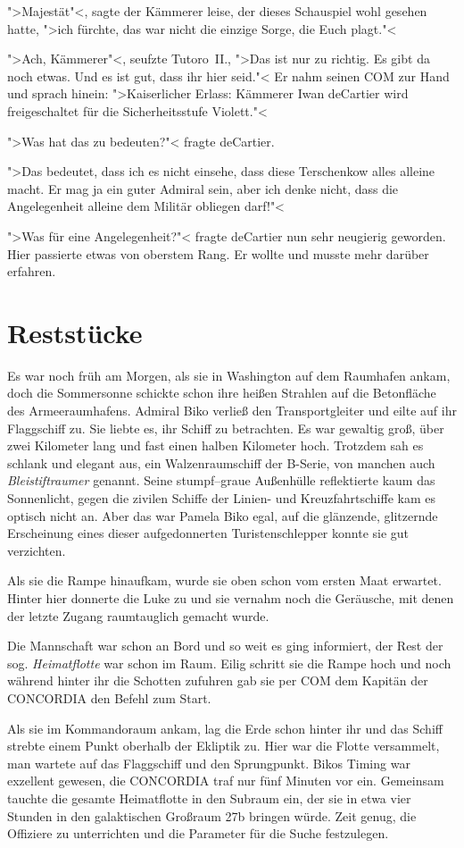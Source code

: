 ">Majestät"<, sagte der Kämmerer leise, der dieses Schauspiel wohl gesehen hatte, ">ich fürchte, das war nicht die einzige Sorge, die Euch plagt."<

">Ach, Kämmerer"<, seufzte Tutoro~II., ">Das ist nur zu richtig. Es gibt da noch etwas. Und es ist gut, dass ihr hier seid."< Er nahm seinen COM zur Hand und sprach hinein: ">Kaiserlicher Erlass: Kämmerer Iwan deCartier wird freigeschaltet für die Sicherheitsstufe Violett."<

">Was hat das zu bedeuten?"< fragte deCartier.

">Das bedeutet, dass ich es nicht einsehe, dass diese Terschenkow alles alleine macht. Er mag ja ein guter Admiral sein, aber ich denke nicht, dass die Angelegenheit alleine dem Militär obliegen darf!"<

">Was für eine Angelegenheit?"< fragte deCartier nun sehr neugierig geworden. Hier passierte etwas von oberstem Rang. Er wollte und musste mehr darüber erfahren.

\chapter*{Reststücke}

Es war noch früh am Morgen, als sie in Washington auf dem Raumhafen ankam, doch die Sommersonne schickte schon ihre heißen Strahlen auf die Betonfläche des Armeeraumhafens. Admiral Biko verließ den Transportgleiter und eilte auf ihr Flaggschiff zu. Sie liebte es, ihr Schiff zu betrachten. Es war gewaltig groß, über zwei Kilometer lang und fast einen halben Kilometer hoch. Trotzdem sah es schlank und elegant aus, ein Walzenraumschiff der \textsf{B-}Serie, von manchen auch \emph{Bleistiftraumer} genannt. Seine stumpf--graue Außenhülle reflektierte kaum das Sonnenlicht, gegen die zivilen Schiffe der Linien- und Kreuzfahrtschiffe kam es optisch nicht an. Aber das war Pamela Biko egal, auf die glänzende, glitzernde Erscheinung eines dieser aufgedonnerten Turistenschlepper konnte sie gut verzichten.

Als sie die Rampe hinaufkam, wurde sie oben schon vom ersten Maat erwartet. Hinter hier donnerte die Luke zu und sie vernahm noch die Geräusche, mit denen der letzte Zugang raumtauglich gemacht wurde. 

Die Mannschaft war schon an Bord und so weit es ging informiert, der Rest der sog. \emph{Heimatflotte} war schon im Raum. Eilig schritt sie die Rampe hoch und noch während hinter ihr die Schotten zufuhren gab sie per COM dem Kapitän der \textsf{CONCORDIA} den Befehl zum Start.

Als sie im Kommandoraum ankam, lag die Erde schon hinter ihr und das Schiff strebte einem Punkt oberhalb der Ekliptik zu. Hier war die Flotte versammelt, man wartete auf das Flaggschiff und den Sprungpunkt. Bikos Timing war exzellent gewesen, die \textsf{CONCORDIA} traf nur fünf Minuten vor ein. Gemeinsam tauchte die gesamte Heimatflotte in den Subraum ein, der sie in etwa vier Stunden in den galaktischen Großraum \textsf{27b} bringen würde. Zeit genug, die Offiziere zu unterrichten und die Parameter für die Suche festzulegen.


